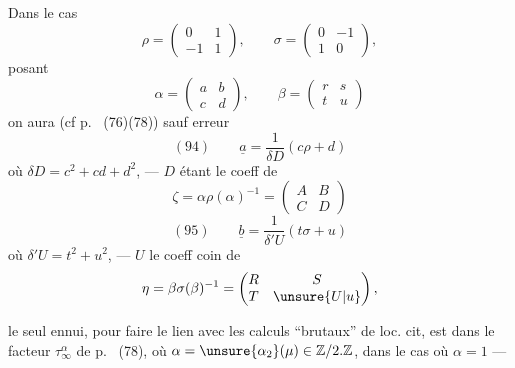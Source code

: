 Dans le cas 
\[
\rho=\begin{pmatrix}0&1\\-1&1\end{pmatrix},\qquad
\sigma=\begin{pmatrix}0&-1\\1&0\end{pmatrix},
\]
posant
\[
\alpha=\begin{pmatrix}a&b\\c&d\end{pmatrix},\qquad
\beta=\begin{pmatrix}r&s\\t&u\end{pmatrix}
\]
on aura (cf p.\  (76)(78)) sauf erreur
\[
(94)\qquad \underline a=\frac1{\delta D}(c\rho+d)
\]
\inserted{\[
\left(=\frac1{c^2+cd+d^2}(c\rho+d)\right)
\]}
où $\delta D=c^2+cd+d^2$, --- $D$ étant le coeff  de
\[
\zeta=\alpha\rho(\alpha)^{-1}=\begin{pmatrix}A&B\\C&D\end{pmatrix}
\]
\[
(95)\qquad \underline b=\frac1{\delta' U}(t\sigma+u)
\]
\inserted{\[
=\frac1{t^2+u^2}(t\sigma+u)
\]}
où $\delta' U=t^2+u^2$, --- $U$ le coeff coin de
\[
\eta=\beta\sigma(\beta)^{-1}=\begin{pmatrix}R&S\\T&\unsure{U|u}\end{pmatrix},
\]

le seul ennui, pour faire le lien avec les calculs ``brutaux'' de loc. cit, est dans le facteur $\tau_\infty^\alpha$ de p.\  (78), où $\alpha=\unsure{\alpha_2}(\mu)\in\mathbb Z/2.\mathbb Z$, dans le cas où $\alpha=1$ ---



